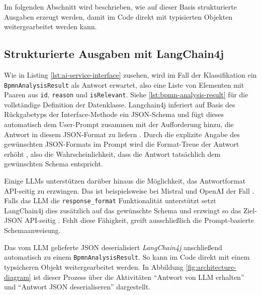 Im folgenden Abschnitt wird beschrieben, wie auf dieser Basis strukturierte Ausgaben erzeugt werden, damit im Code direkt mit typisierten Objekten weitergearbeitet werden kann.

\subsection*{Strukturierte Ausgaben mit LangChain4j}

Wie in Listing \ref{lst:ai-service-interface} zusehen, wird im Fall der Klassifikation ein \texttt{BpmnAnalysisResult} als Antwort erwartet, also eine Liste von Elementen mit Paaren aus \texttt{id}, \texttt{reason} und \texttt{isRelevant}. Siehe \ref{lst:bpmn-analysis-result} für die vollständige Definition der Datenklasse. Langchain4j inferiert auf Basis des Rückgabetyps der Interface-Methode ein JSON-Schema und fügt dieses automatisch dem User-Prompt zusammen mit der Aufforderung hinzu, die Antwort in diesem JSON-Format zu liefern \cite{langchain4j-ai-services}. Durch die explizite Angabe des gewünschten JSON-Formats im Prompt wird die Format-Treue der Antwort erhöht \cite{liu2023prompting}, also die Wahrscheinlichkeit, dass die Antwort tatsächlich dem gewünschten Schema entspricht.

Einige \acp{LLM} unterstützen darüber hinaus die Möglichkeit, das Antwortformat API-seitig zu erzwingen. Das ist beispielsweise bei Mistral und OpenAI der Fall \cite{mistralai_structured_output, openai_structured_output}.
Falls das \ac{LLM} die \texttt{response\_format} Funktionalität unterstützt setzt LangChain4j dies zusätzlich auf das gewünschte Schema und erzwingt so das Ziel-JSON API-seitig \cite{langchain4j-ai-services}. Fehlt diese Fähigkeit, greift ausschließlich die Prompt-basierte Schemaanweisung.

Das vom \ac{LLM} gelieferte JSON deserialisiert \emph{LangChain4j} anschließend automatisch zu einem \texttt{BpmnAnalysisResult}. So kann im Code direkt mit einem typsicheren Objekt weitergearbeitet werden. In Abbildung \ref{fig:architecture-diagram} ist dieser Prozess über die Aktivitäten \enquote{Antwort von LLM erhalten} und \enquote{Antwort JSON deserialiseren} dargestellt.
